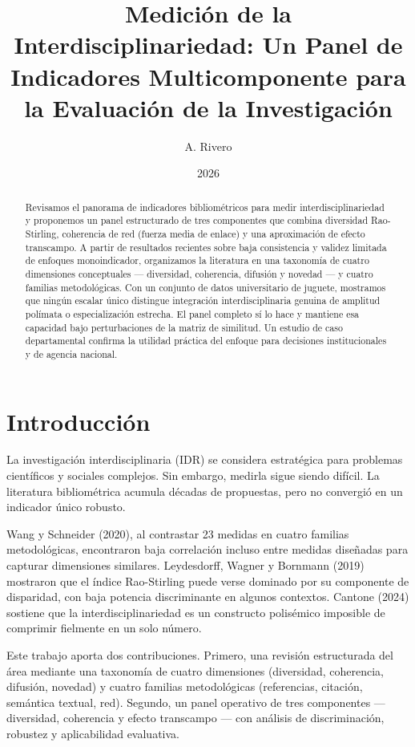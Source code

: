 \documentclass[
]{article}
\title{Medición de la Interdisciplinariedad: Un Panel de Indicadores
Multicomponente para la Evaluación de la Investigación}
\author{A. Rivero}
\date{2026}
\begin{document}
\maketitle
\begin{abstract}
Revisamos el panorama de indicadores bibliométricos para medir
interdisciplinariedad y proponemos un panel estructurado de tres
componentes que combina diversidad Rao-Stirling, coherencia de red
(fuerza media de enlace) y una aproximación de efecto transcampo. A
partir de resultados recientes sobre baja consistencia y validez
limitada de enfoques monoindicador, organizamos la literatura en una
taxonomía de cuatro dimensiones conceptuales --- diversidad, coherencia,
difusión y novedad --- y cuatro familias metodológicas. Con un conjunto
de datos universitario de juguete, mostramos que ningún escalar único
distingue integración interdisciplinaria genuina de amplitud polímata o
especialización estrecha. El panel completo sí lo hace y mantiene esa
capacidad bajo perturbaciones de la matriz de similitud. Un estudio de
caso departamental confirma la utilidad práctica del enfoque para
decisiones institucionales y de agencia nacional.
\end{abstract}

\hypertarget{introducciuxf3n}{%
\section{Introducción}\label{introducciuxf3n}}

La investigación interdisciplinaria (IDR) se considera estratégica para
problemas científicos y sociales complejos. Sin embargo, medirla sigue
siendo difícil. La literatura bibliométrica acumula décadas de
propuestas, pero no convergió en un indicador único robusto.

Wang y Schneider (2020), al contrastar 23 medidas en cuatro familias
metodológicas, encontraron baja correlación incluso entre medidas
diseñadas para capturar dimensiones similares. Leydesdorff, Wagner y
Bornmann (2019) mostraron que el índice Rao-Stirling puede verse
dominado por su componente de disparidad, con baja potencia
discriminante en algunos contextos. Cantone (2024) sostiene que la
interdisciplinariedad es un constructo polisémico imposible de comprimir
fielmente en un solo número.

Este trabajo aporta dos contribuciones. Primero, una revisión
estructurada del área mediante una taxonomía de cuatro dimensiones
(diversidad, coherencia, difusión, novedad) y cuatro familias
metodológicas (referencias, citación, semántica textual, red). Segundo,
un panel operativo de tres componentes --- diversidad, coherencia y
efecto transcampo --- con análisis de discriminación, robustez y
aplicabilidad evaluativa.
\end{document}
